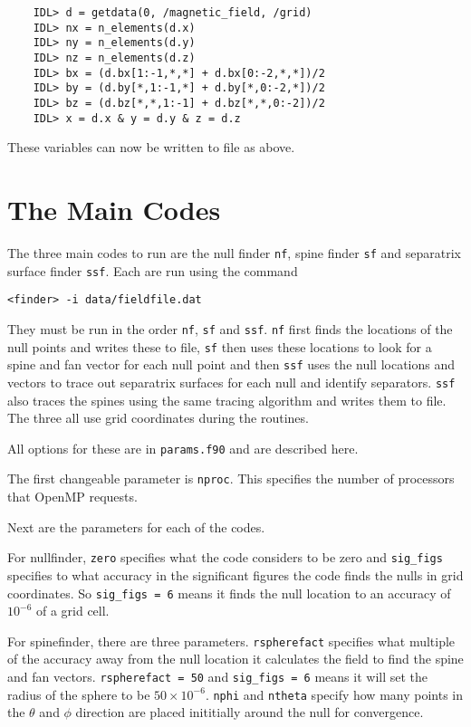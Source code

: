 \documentclass[12pt]{article}
\begin{document}
      \begin{verbatim}
    IDL> d = getdata(0, /magnetic_field, /grid)
    IDL> nx = n_elements(d.x)
    IDL> ny = n_elements(d.y)
    IDL> nz = n_elements(d.z)
    IDL> bx = (d.bx[1:-1,*,*] + d.bx[0:-2,*,*])/2
    IDL> by = (d.by[*,1:-1,*] + d.by[*,0:-2,*])/2
    IDL> bz = (d.bz[*,*,1:-1] + d.bz[*,*,0:-2])/2
    IDL> x = d.x & y = d.y & z = d.z
      \end{verbatim}

      These variables can now be written to file as above.

  \section{The Main Codes}

    The three main codes to run are the null finder \texttt{nf}, spine finder \texttt{sf} and separatrix surface finder \texttt{ssf}. Each are run using the command

    \texttt{<finder> -i data/fieldfile.dat}

    They must be run in the order \texttt{nf}, \texttt{sf} and \texttt{ssf}. \texttt{nf} first finds the locations of the null points and writes these to file, \texttt{sf} then uses these locations to look for a spine and fan vector for each null point and then \texttt{ssf} uses the null locations and vectors to trace out separatrix surfaces for each null and identify separators. \texttt{ssf} also traces the spines using the same tracing algorithm and writes them to file. The three all use grid coordinates during the routines.

    All options for these are in \texttt{params.f90} and are described here.

    The first changeable parameter is \texttt{nproc}. This specifies the number of processors that OpenMP requests.

    Next are the parameters for each of the codes. 
    
    For nullfinder, \texttt{zero} specifies what the code considers to be zero and \texttt{sig\_figs} specifies to what accuracy in the significant figures the code finds the nulls in grid coordinates. So \texttt{sig\_figs = 6} means it finds the null location to an accuracy of \( 10^{-6} \) of a grid cell.

    For spinefinder, there are three parameters. \texttt{rspherefact} specifies what multiple of the accuracy away from the null location it calculates the field to find the spine and fan vectors. \texttt{rspherefact = 50} and \texttt{sig\_figs = 6} means it will set the radius of the sphere to be \( 50 \times 10^{-6} \). \texttt{nphi} and \texttt{ntheta} specify how many points in the \( \theta \) and \( \phi \) direction are placed inititially around the null for convergence.
\end{document}
